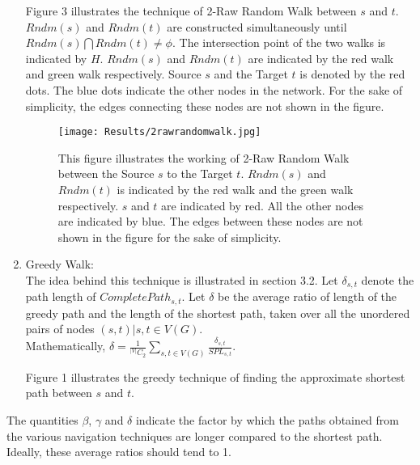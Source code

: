 \documentclass{article}
\begin{document}
\begin{enumerate}
Figure 3 illustrates the technique of 2-Raw Random Walk between $s$ and $t$. $Rndm(s)$ and $Rndm(t)$ are constructed simultaneously until $Rndm(s) \bigcap Rndm(t) \ne \phi$. The intersection point of the two walks is indicated by $H$. $Rndm(s)$ and $Rndm(t)$ are indicated by the red walk and green walk respectively. Source $s$ and the Target $t$ is denoted by the red dots. The blue dots indicate the other nodes in the network. For the sake of simplicity, the edges connecting these nodes are not shown in the figure.

\begin{figure}[htp]
\centering
\texttt{[image: Results/2rawrandomwalk.jpg]}
\caption{This figure illustrates the working of 2-Raw Random Walk between the Source $s$ to the Target $t$. $Rndm(s)$ and $Rndm(t)$ is indicated by the red walk and the green walk respectively. $s$ and $t$ are indicated by red. All the other nodes are indicated by blue. The edges between these nodes are not shown in the figure for the sake of simplicity.}
\label{}
\end{figure}

\item Greedy Walk:\\
The idea behind this technique is illustrated in section 3.2. Let $\delta_{s,t}$ denote the path length of $CompletePath_{s,t}$. Let $\delta$ be the average ratio of length of the greedy path and the length of the shortest path, taken over all the unordered pairs of nodes $(s,t) | s,t \in V(G)$.\\
Mathematically, $\delta = \frac{1}{^{|V|}C_2} \sum_{s,t \in V(G)} \frac{\delta_{s,t}}{SPL_{s,t}}$.

Figure 1 illustrates the greedy technique of finding the approximate shortest  path between $s$ and $t$. 

\end{enumerate}

The quantities $\beta$, $\gamma$ and $\delta$ indicate the factor by which the paths obtained from the various navigation techniques are longer compared to the shortest path. Ideally, these average ratios should tend to 1.\\
\end{document}
